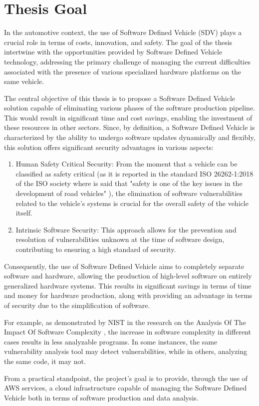 \section{Thesis Goal}
In the automotive context, the use of Software Defined Vehicle (SDV) plays a crucial role in terms of costs, innovation, and safety. The goal of the thesis intertwine with the opportunities provided by Software Defined Vehicle technology, addressing the primary challenge of managing the current difficulties associated with the presence of various specialized hardware platforms on the same vehicle.

The central objective of this thesis is to propose a Software Defined Vehicle solution capable of eliminating various phases of the software production pipeline. This would result in significant time and cost savings, enabling the investment of these resources in other sectors. Since, by definition, a Software Defined Vehicle is characterized by the ability to undergo software updates dynamically and flexibly, this solution offers significant security advantages in various aspects:
\begin{enumerate}
  \item Human Safety Critical Security: From the moment that a vehicle can be classified as safety critical (as it is reported in the standard ISO 26262-1:2018 of the ISO society where is said that "safety is one of the key issues in the development of road vehicles" \cite{ISO26262}), the elimination of software vulnerabilities related to the vehicle's systems is crucial for the overall safety of the vehicle itself.  
  \item Intrinsic Software Security: This approach allows for the prevention and resolution of vulnerabilities unknown at the time of software design, contributing to ensuring a high standard of security.
\end{enumerate}

Consequently, the use of Software Defined Vehicle aims to completely separate software and hardware, allowing the production of high-level software on entirely generalized hardware systems. This results in significant savings in terms of time and money for hardware production, along with providing an advantage in terms of security due to the simplification of software.

For example, as demonstrated by NIST in the research on the Analysis Of The Impact Of Software Complexity \cite{NISTCodeComplexity}, the increase in software complexity in different cases results in less analyzable programs. In some instances, the same vulnerability analysis tool may detect vulnerabilities, while in others, analyzing the same code, it may not. 

From a practical standpoint, the project's goal is to provide, through the use of AWS services, a cloud infrastructure capable of managing the Software Defined Vehicle both in terms of software production and data analysis.